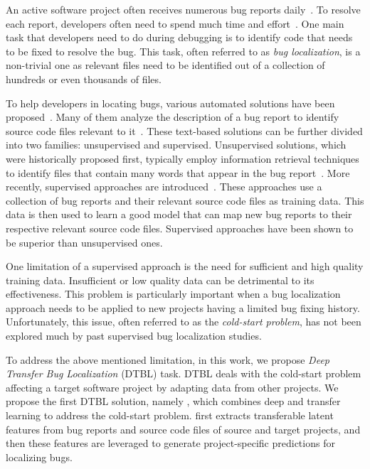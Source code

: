 An active software project often receives numerous bug reports daily~\cite{AnvikHM05}. To resolve each report, developers often need to spend much time and effort~\cite{Tassey02}. One main task that developers need to do during debugging is to identify code that needs to be fixed to resolve the bug. This task, often referred to as {\em bug localization}, is a non-trivial one as relevant files need to be identified out of a collection of hundreds or even thousands of files.

To help developers in locating bugs, various automated solutions have been proposed~\cite{JonesH05,lukins2008source,rao2011retrieval,SahaLKP14,huo2016learning}. Many of them analyze the description of a bug report to identify source code files relevant to it~\cite{lukins2008source,rao2011retrieval,SahaLKP14,huo2016learning}. These text-based solutions can be further divided into two families: unsupervised and supervised. Unsupervised solutions, which were historically proposed first, typically employ information retrieval techniques to identify files that contain many words that appear in the bug report~\cite{lukins2008source,rao2011retrieval,SahaLKP14}. More recently, supervised approaches are introduced~\cite{zhou2012should,huo2016learning}. These approaches use a collection of bug reports and their relevant source code files as training data. This data is then used to learn a good model that can map new bug reports to their respective relevant source code files. Supervised approaches have been shown to be superior than unsupervised ones.

One limitation of a supervised approach is the need for sufficient and high quality training data. Insufficient or low quality data can be detrimental to its effectiveness. This problem is particularly important when a bug localization approach needs to be applied to new projects having a limited bug fixing history. Unfortunately, this issue, often referred to as the {\em cold-start problem}, has not been explored much by past supervised bug localization studies.

To address the above mentioned limitation, in this work, we propose {\em Deep Transfer Bug Localization} (DTBL) task. DTBL deals with the cold-start problem affecting a target software project by adapting data from other projects. We propose the first DTBL solution, namely \TRANPCNN, which combines deep and transfer learning to address the cold-start problem. \TRANPCNN first extracts  transferable latent features from bug reports and source code files of source and target projects, and then these features are leveraged to generate project-specific predictions for localizing bugs.%

